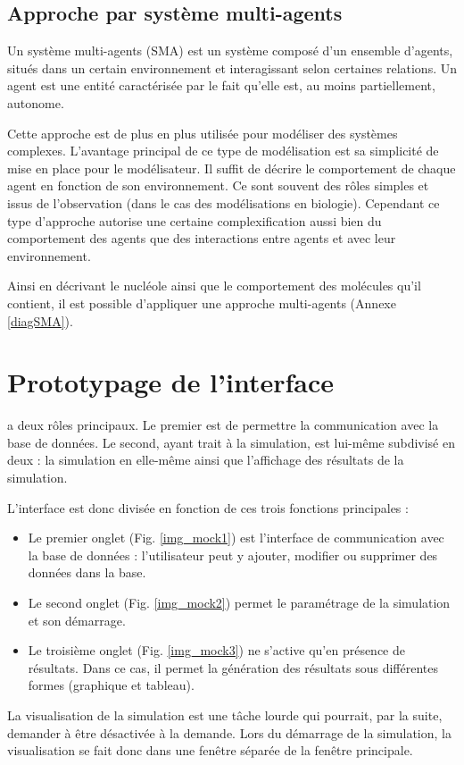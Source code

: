 \subsection{Approche par système multi-agents}

Un système multi-agents (SMA) est un système composé d'un ensemble
d'agents, situés dans un certain environnement et interagissant selon
certaines relations. Un agent est une entité caractérisée par le fait
qu'elle est, au moins partiellement, autonome.

Cette approche est de plus en plus utilisée pour modéliser des
systèmes complexes. L'avantage principal de ce type de modélisation
est sa simplicité de mise en place pour le modélisateur. Il suffit de
décrire le comportement de chaque agent en fonction de son
environnement. Ce sont souvent des rôles simples et issus de
l'observation (dans le cas des modélisations en biologie). Cependant
ce type d'approche autorise une certaine complexification aussi bien
du comportement des agents que des interactions entre agents et avec
leur environnement.

Ainsi en décrivant le nucléole ainsi que le comportement des molécules
qu'il contient, il est possible d'appliquer une approche multi-agents
(Annexe \ref{diagSMA}).

\section{Prototypage de l'interface}

\NQ a deux rôles principaux. Le premier est de permettre la
communication avec la base de données. Le second, ayant trait à la
simulation, est lui-même subdivisé en deux : la simulation en
elle-même ainsi que l'affichage des résultats de la simulation.

L'interface est donc divisée en fonction de ces trois fonctions
principales : 

\begin{itemize}
\item Le premier onglet (Fig. \ref{img_mock1}) est l'interface de communication avec la base de données : l'utilisateur peut y ajouter, modifier ou supprimer des données dans la base.
\item Le second onglet (Fig. \ref{img_mock2}) permet le paramétrage de
  la simulation et son démarrage.
\item Le troisième onglet (Fig. \ref{img_mock3}) ne s'active qu'en
  présence de résultats. Dans ce cas, il permet la génération des
  résultats sous différentes formes (graphique et tableau).
\end{itemize}

La visualisation de la simulation est une tâche lourde qui pourrait,
par la suite, demander à être désactivée à la demande. Lors du
démarrage de la simulation, la visualisation se fait donc dans une
fenêtre séparée de la fenêtre principale.


